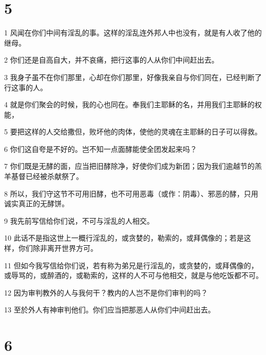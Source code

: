 \chapter{5}

\par 1 风闻在你们中间有淫乱的事。这样的淫乱连外邦人中也没有，就是有人收了他的继母。
\par 2 你们还是自高自大，并不哀痛，把行这事的人从你们中间赶出去。
\par 3 我身子虽不在你们那里，心却在你们那里，好像我亲自与你们同在，已经判断了行这事的人。
\par 4 就是你们聚会的时候，我的心也同在。奉我们主耶稣的名，并用我们主耶稣的权能，
\par 5 要把这样的人交给撒但，败坏他的肉体，使他的灵魂在主耶稣的日子可以得救。
\par 6 你们这自夸是不好的。岂不知一点面酵能使全团发起来吗？
\par 7 你们既是无酵的面，应当把旧酵除净，好使你们成为新团；因为我们逾越节的羔羊基督已经被杀献祭了。
\par 8 所以，我们守这节不可用旧酵，也不可用恶毒（或作：阴毒）、邪恶的酵，只用诚实真正的无酵饼。
\par 9 我先前写信给你们说，不可与淫乱的人相交。
\par 10 此话不是指这世上一概行淫乱的，或贪婪的，勒索的，或拜偶像的；若是这样，你们除非离开世界方可。
\par 11 但如今我写信给你们说，若有称为弟兄是行淫乱的，或贪婪的，或拜偶像的，或辱骂的，或醉酒的，或勒索的，这样的人不可与他相交，就是与他吃饭都不可。
\par 12 因为审判教外的人与我何干？教内的人岂不是你们审判的吗？
\par 13 至於外人有神审判他们。你们应当把那恶人从你们中间赶出去。

\chapter{6}

